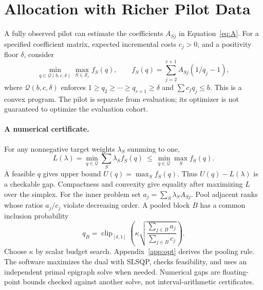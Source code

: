 \documentclass[12pt]{clear2027}
\newcommand{\calS}{\mathcal{S}}
\begin{document}
\section{Allocation with Richer Pilot Data}
A fully observed pilot can estimate the coefficients $A_{Sj}$ in Equation~\eqref{eq:A}. For a specified coefficient matrix, expected incremental costs $c_j>0$, and a positivity floor $\delta$, consider
\begin{equation}
 \min_{q\in\mathcal Q(b,c,\delta)}\max_{S\in\calS_r}
 f_S(q),\qquad f_S(q)=\sum_{j=2}^{r+1}A_{Sj}(1/q_j-1),\label{eq:opt}
\end{equation}
where $\mathcal Q(b,c,\delta)$ enforces $1\ge q_2\ge\cdots\ge q_{r+1}\ge\delta$ and $\sum c_jq_j\le b$. This is a convex program. The pilot is separate from evaluation; its optimizer is not guaranteed to optimize the evaluation cohort.

\paragraph{A numerical certificate.}
For any nonnegative target weights $\lambda_S$ summing to one,
\begin{equation}
 L(\lambda)=\min_{q\in\mathcal Q}\sum_S\lambda_S f_S(q)
 \ \le\ \min_{q\in\mathcal Q}\max_S f_S(q).\label{eq:dual}
\end{equation}
A feasible $q$ gives upper bound $U(q)=\max_S f_S(q)$. Thus $U(q)-L(\lambda)$ is a checkable gap. Compactness and convexity give equality after maximizing $L$ over the simplex. For the inner problem set $a_j=\sum_S\lambda_S A_{Sj}$. Pool adjacent ranks whose ratios $a_j/c_j$ violate decreasing order. A pooled block $B$ has a common inclusion probability
\begin{equation}
 q_B=\operatorname{clip}_{[\delta,1]}\!\left(
 \kappa\sqrt{\frac{\sum_{j\in B}a_j}{\sum_{j\in B}c_j}}\right).\label{eq:pava}
\end{equation}
Choose $\kappa$ by scalar budget search. Appendix~\ref{app:opt} derives the pooling rule. The software maximizes the dual with SLSQP, checks feasibility, and uses an independent primal epigraph solve when needed. Numerical gaps are floating-point bounds checked against another solve, not interval-arithmetic certificates.
\end{document}
